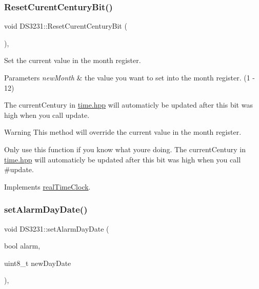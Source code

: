 \subsubsection{\texorpdfstring{Reset\+Curent\+Century\+Bit()}{ResetCurentCenturyBit()}}
{\footnotesize\ttfamily void D\+S3231\+::\+Reset\+Curent\+Century\+Bit (\begin{DoxyParamCaption}{ }\end{DoxyParamCaption})\hspace{0.3cm}{\ttfamily [override]}, {\ttfamily [virtual]}}



Set the current value in the month register. 


\begin{DoxyParams}{Parameters}
{\em new\+Month} & the value you want to set into the month register. (1 -\/ 12)\\
\hline
\end{DoxyParams}
The current\+Century in \mbox{\hyperlink{time_8hpp_source}{time.\+hpp}} will automaticly be updated after this bit was high when you call update. \begin{DoxyWarning}{Warning}
This method will override the current value in the month register. 

Only use this function if you know what you\textquotesingle{}re doing. The current\+Century in \mbox{\hyperlink{time_8hpp_source}{time.\+hpp}} will automaticly be updated after this bit was high when you call \#update. 
\end{DoxyWarning}


Implements \mbox{\hyperlink{classreal_time_clock_a50e19a6b0aef44719e91e3e753da0dce}{real\+Time\+Clock}}.

\mbox{\label{class_d_s3231_aa2048cc766ca58f707e84cbc564c1276}} 
\subsubsection{\texorpdfstring{set\+Alarm\+Day\+Date()}{setAlarmDayDate()}}
{\footnotesize\ttfamily void D\+S3231\+::set\+Alarm\+Day\+Date (\begin{DoxyParamCaption}\item[{bool}]{alarm,  }\item[{uint8\+\_\+t}]{new\+Day\+Date }\end{DoxyParamCaption})\hspace{0.3cm}{\ttfamily [override]}, {\ttfamily [virtual]}}



